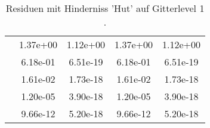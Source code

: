 \begin{table}
\begin{tabular}{c|cc|cc|}
\multicolumn{1}{|c|}{} & \multicolumn{1}{|c|}{  1.37e+00} & \multicolumn{1}{|c|}{  1.12e+00} & \multicolumn{1}{|c|}{  1.37e+00} & \multicolumn{1}{|c|}{  1.12e+00} \\ 
\multicolumn{1}{|c|}{} & \multicolumn{1}{|c|}{  6.18e-01} & \multicolumn{1}{|c|}{  6.51e-19} & \multicolumn{1}{|c|}{  6.18e-01} & \multicolumn{1}{|c|}{  6.51e-19} \\ 
\multicolumn{1}{|c|}{} & \multicolumn{1}{|c|}{  1.61e-02} & \multicolumn{1}{|c|}{  1.73e-18} & \multicolumn{1}{|c|}{  1.61e-02} & \multicolumn{1}{|c|}{  1.73e-18} \\ 
\multicolumn{1}{|c|}{} & \multicolumn{1}{|c|}{  1.20e-05} & \multicolumn{1}{|c|}{  3.90e-18} & \multicolumn{1}{|c|}{  1.20e-05} & \multicolumn{1}{|c|}{  3.90e-18} \\ 
\multicolumn{1}{|c|}{} & \multicolumn{1}{|c|}{  9.66e-12} & \multicolumn{1}{|c|}{  5.20e-18} & \multicolumn{1}{|c|}{  9.66e-12} & \multicolumn{1}{|c|}{  5.20e-18} \\ 
\hline 
\end{tabular}\caption{Residuen mit Hinderniss 'Hut' auf Gitterlevel 1 .}\label{tab:Residuum_Hut_level1}
\end{table} 
